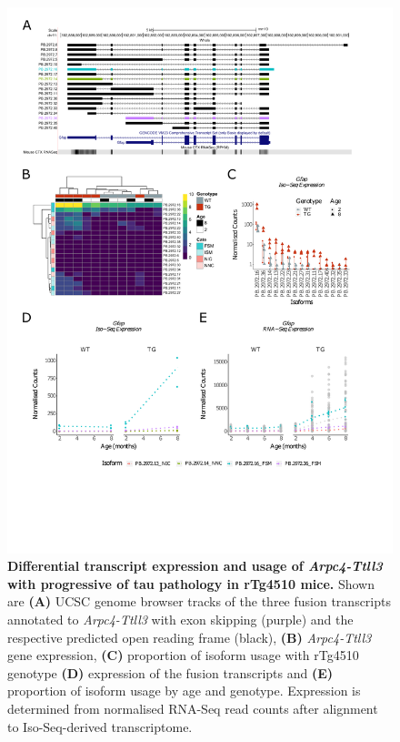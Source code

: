 \begin{figure}[!htp]
	\centering
	\includegraphics[page=7,trim={1.5cm 1.5cm 2cm 1cm}, scale = 0.80]{Figures/Ch5_DiffPlots.pdf}
	\captionsetup{width=0.95\textwidth}
	\caption[Differential \textit{Arpc4-Ttll3} transcript expression and usage]%
	{\textbf{Differential transcript expression and usage of \textit{Arpc4-Ttll3} with progressive of tau pathology in rTg4510 mice.} Shown are \textbf{(A)} UCSC genome browser tracks of the three fusion transcripts annotated to \textit{Arpc4-Ttll3} with exon skipping (purple) and the respective predicted open reading frame (black), \textbf{(B)} \textit{Arpc4-Ttll3} gene expression, \textbf{(C)} proportion of isoform usage with rTg4510 genotype \textbf{(D)} expression of the fusion transcripts and \textbf{(E)} proportion of isoform usage by age and genotype. Expression is determined from normalised RNA-Seq read counts after alignment to Iso-Seq-derived transcriptome.} 
	\label{fig:DIU_Arpc4}
\end{figure}

